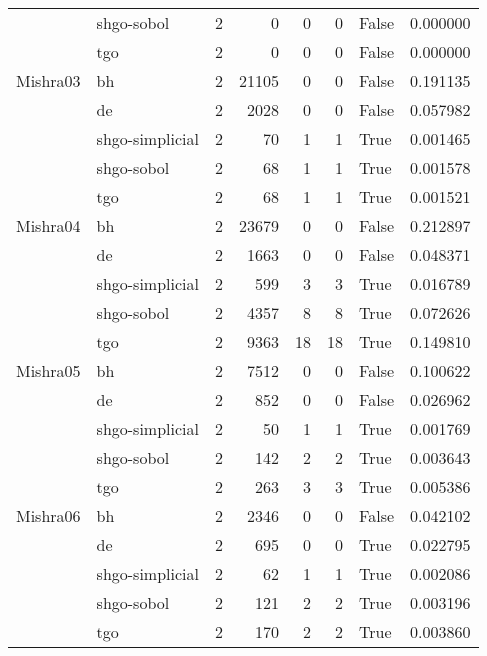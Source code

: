 \begin{longtable}{llrrrrlr}
         & shgo-sobol &     2 &        0 &      0 &       0 &   False &    0.000000 \\
         & tgo &     2 &        0 &      0 &       0 &   False &    0.000000 \\
Mishra03 & bh &     2 &    21105 &      0 &       0 &   False &    0.191135 \\
         & de &     2 &     2028 &      0 &       0 &   False &    0.057982 \\
         & shgo-simplicial &     2 &       70 &      1 &       1 &    True &    0.001465 \\
         & shgo-sobol &     2 &       68 &      1 &       1 &    True &    0.001578 \\
         & tgo &     2 &       68 &      1 &       1 &    True &    0.001521 \\
Mishra04 & bh &     2 &    23679 &      0 &       0 &   False &    0.212897 \\
         & de &     2 &     1663 &      0 &       0 &   False &    0.048371 \\
         & shgo-simplicial &     2 &      599 &      3 &       3 &    True &    0.016789 \\
         & shgo-sobol &     2 &     4357 &      8 &       8 &    True &    0.072626 \\
         & tgo &     2 &     9363 &     18 &      18 &    True &    0.149810 \\
Mishra05 & bh &     2 &     7512 &      0 &       0 &   False &    0.100622 \\
         & de &     2 &      852 &      0 &       0 &   False &    0.026962 \\
         & shgo-simplicial &     2 &       50 &      1 &       1 &    True &    0.001769 \\
         & shgo-sobol &     2 &      142 &      2 &       2 &    True &    0.003643 \\
         & tgo &     2 &      263 &      3 &       3 &    True &    0.005386 \\
Mishra06 & bh &     2 &     2346 &      0 &       0 &   False &    0.042102 \\
         & de &     2 &      695 &      0 &       0 &    True &    0.022795 \\
         & shgo-simplicial &     2 &       62 &      1 &       1 &    True &    0.002086 \\
         & shgo-sobol &     2 &      121 &      2 &       2 &    True &    0.003196 \\
         & tgo &     2 &      170 &      2 &       2 &    True &    0.003860 \\

\end{longtable}
